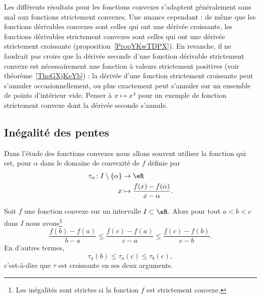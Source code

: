 \begin{normaltext}
	Les différents résultats pour les fonctions convexes s'adaptent généralement sans mal aux fonctions strictement convexes. Une nuance cependant : de même que les fonctions dérivables convexes sont celles qui ont une dérivée croissante, les fonctions dérivables strictement convexes sont celles qui ont une dérivée strictement croissante (proposition~\ref{PropYKwTDPX}). En revanche, il ne faudrait pas croire que la dérivée seconde d'une fonction dérivable strictement convexe est nécessairement une fonction à valeurs strictement positives (voir théorème~\ref{ThoGXjKeYb}) : la dérivée d'une fonction strictement croissante peut s'annuler occasionnellement, ou plus exactement peut s'annuler sur un ensemble de points d'intérieur vide. Penser à \( x\mapsto x^4\) pour un exemple de fonction strictement convexe dont la dérivée seconde s'annule.
\end{normaltext}

\subsection{Inégalité des pentes}

Dans l'étude des fonctions convexes nous allons souvent utiliser la fonction  qui est, pour \( \alpha\) dans le domaine de convexité de \( f\) définie par
\begin{equation}    \label{EqRYBazWd}
	\begin{aligned}
		\tau_{\alpha}\colon I\setminus\{ \alpha \} & \to \eR                                      \\
		x                                          & \mapsto \frac{ f(x)-f(\alpha) }{ x-\alpha }.
	\end{aligned}
\end{equation}

\begin{proposition} \label{PropMDMGjGO}
	Soit \( f\) une fonction convexe sur un intervalle \( I\subset \eR\). Alors pour tout \( a<b<c\) dans \( I\) nous avons\footnote{Les inégalités sont strictes si la fonction \( f\) est strictement convexe.}
	\begin{equation}
		\frac{ f(b)-f(a)  }{ b-a }\leq\frac{ f(c)-f(a) }{ c-a }\leq \frac{ f(c)-f(b) }{ c-b }.
	\end{equation}
	En d'autres termes,
	\begin{equation}
		\tau_a(b)\leq\tau_a(c)\leq \tau_b(c),
	\end{equation}
	c'est-à-dire que \( \tau\) est croissante en ses deux arguments.
\end{proposition}

